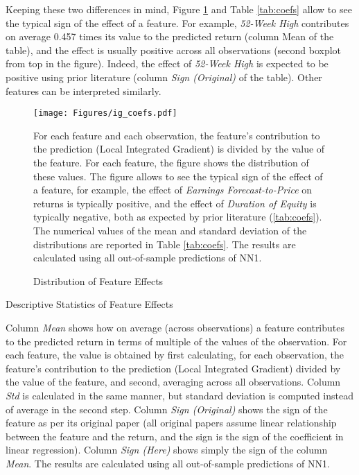 	Keeping these two differences in mind, Figure \ref{fig:coefs} and Table \ref{tab:coefs} allow to see the typical sign of the effect of a feature. For example, \textit{52-Week High} contributes on average 0.457 times its value to the predicted return (column Mean of the table), and the effect is usually positive across all observations (second boxplot from top in the figure). Indeed, the effect of \textit{52-Week High} is expected to be positive using prior literature (column \textit{Sign (Original)} of the table). Other features can be interpreted similarly.  
	
	\begin{figure}
		\texttt{[image: Figures/ig\_coefs.pdf]}
		\caption{Distribution of Feature Effects}
		\label{fig:coefs}
		\medskip
		\small
		For each feature and each observation, the feature's contribution to the prediction (Local Integrated Gradient) is divided by the value of the feature. For each feature, the figure shows the distribution of these values.   The figure allows to see the typical sign of the effect of a feature, for example, the effect of \textit{Earnings Forecast-to-Price} on returns is typically positive, and the effect of \textit{Duration of Equity} is typically negative, both as expected by prior literature (\ref{tab:coefs}). The numerical values of the mean and standard deviation of the distributions are reported in Table \ref{tab:coefs}. The results are calculated using all out-of-sample predictions of NN1. 
	\end{figure} 
	
	\begin{table}
		\resizebox{\textwidth}{!}{}
		\caption{Descriptive Statistics of Feature Effects}
		\label{tab:coefs}
		\medskip
		\small
		Column \textit{Mean} shows how on average (across observations) a feature contributes to the predicted return in terms of multiple of the values of the observation. For each feature, the value is obtained by first calculating, for each observation, the feature's contribution to the prediction (Local Integrated Gradient) divided by the value of the feature, and second, averaging across all observations. Column \textit{Std} is calculated in the same manner, but standard deviation is computed instead of average in the second step. Column \textit{Sign (Original)} shows the sign of the feature as per its original paper (all original papers assume linear relationship between the feature and the return, and the sign is the sign of the coefficient in linear regression). Column \textit{Sign (Here)} shows simply the sign of the column \textit{Mean}. The results are calculated using all out-of-sample predictions of NN1.
	\end{table}
	
